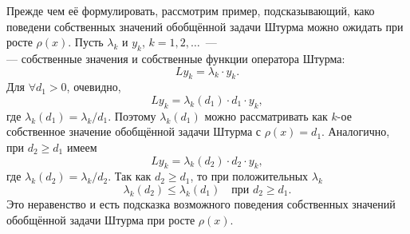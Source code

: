 Прежде чем её формулировать{\mb,} рассмотрим пример, подсказывающий{\mb,} како{} поведени{} собственных значений обобщённой задачи Штурма можно ожидать при росте $\rho(x)$. Пусть $\lambda_k$ и $y_k$, $k=1,2,\ldots${\mb~---\\---}  собственные значения и собственные функции оператора Штурма:
\begin{equation*}
	L y_k=\lambda_k\cdot y_k.
\end{equation*}
Для $\forall d_1>0${\mb,} очевидно{\mb,}
\begin{equation*}
	L y_k=\lambda_k(d_1)\cdot d_1\cdot y_k,
\end{equation*}
где $\lambda_k(d_1)=\lambda_k/d_1$. Поэтому $\lambda_k(d_1)$ можно рассматривать как $k$-ое собственное значение обобщённой задачи Штурма с $\rho(x)=d_1$. Аналогично{\mb,} при $d_2\geqslant d_1$ имеем 
\begin{equation*}
	L y_k=\lambda_k(d_2)\cdot d_2\cdot y_k,
\end{equation*}
где $\lambda_k(d_2)=\lambda_k/d_2$. Так как $d_2\geqslant d_1$, то при положительных $\lambda_k$
\begin{equation*}
	\lambda_k(d_2)\leqslant\lambda_k(d_1)\quad\text{при }d_2\geqslant d_1.
\end{equation*}
Это неравенство и есть подсказка возможного поведения собственных значений обобщённой задачи Штурма при росте $\rho(x)$.

